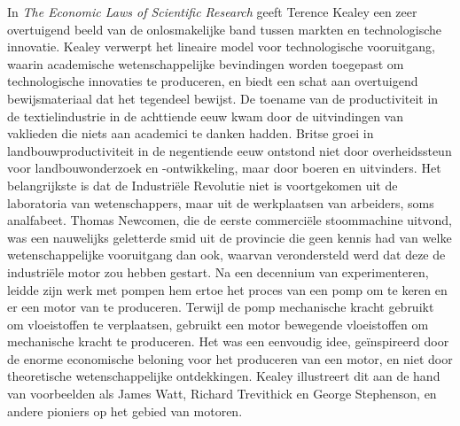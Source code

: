 In \emph{The Economic Laws of Scientific Research} geeft Terence Kealey een zeer overtuigend beeld van de onlosmakelijke band tussen markten en technologische innovatie. \autocite{78} Kealey verwerpt het lineaire model voor technologische vooruitgang, waarin academische wetenschappelijke bevindingen worden toegepast om technologische innovaties te produceren, en biedt een schat aan overtuigend bewijsmateriaal dat het tegendeel bewijst. De toename van de productiviteit in de textielindustrie in de achttiende eeuw kwam door de uitvindingen van vaklieden die niets aan academici te danken hadden. Britse groei in landbouwproductiviteit in de negentiende eeuw ontstond niet door overheidssteun voor landbouwonderzoek en -ontwikkeling, maar door boeren en uitvinders. Het belangrijkste is dat de Industriële Revolutie niet is voortgekomen uit de laboratoria van wetenschappers, maar uit de werkplaatsen van arbeiders, soms analfabeet. Thomas Newcomen, die de eerste commerciële stoommachine uitvond, was een nauwelijks geletterde smid uit de provincie die geen kennis had van welke wetenschappelijke vooruitgang dan ook, waarvan verondersteld werd dat deze de industriële motor zou hebben gestart. Na een decennium van experimenteren, leidde zijn werk met pompen hem ertoe het proces van een pomp om te keren en er een motor van te produceren. Terwijl de pomp mechanische kracht gebruikt om vloeistoffen te verplaatsen, gebruikt een motor bewegende vloeistoffen om mechanische kracht te produceren. Het was een eenvoudig idee, geïnspireerd door de enorme economische beloning voor het produceren van een motor, en niet door theoretische wetenschappelijke ontdekkingen. Kealey illustreert dit aan de hand van voorbeelden als James Watt, Richard Trevithick en George Stephenson, en andere pioniers op het gebied van motoren.


